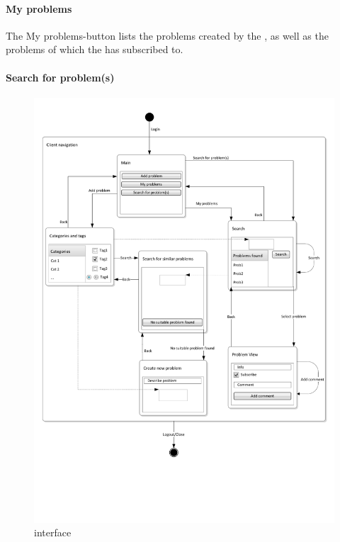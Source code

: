 \paragraph{My problems} The My problems-button lists the problems created by the \aclient[], as well as the problems of which the \aclient[] has subscribed to.
\paragraph{Search for problem(s)}



\begin{figure}[h]
\begin{center}
 \includegraphics[scale=0.70]{input/application_domain_analysis/client_interface}
\caption{\Client[] interface}
\label{fig:client_interface}
\end{center}
\end{figure}

